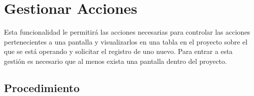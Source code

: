 \hypertarget{cv:gestionarAcciones}{\section{Gestionar Acciones}} \label{sec:GestionarAcciones}

	Esta funcionalidad le permitirá las acciones necesarias para controlar las acciones pertenecientes a una pantalla y visualizarlos en una tabla en el proyecto sobre el que se está operando y solicitar el registro de uno nuevo. Para entrar a esta gestión es necesario que al menos exista una pantalla dentro del proyecto.

		\subsection{Procedimiento}

